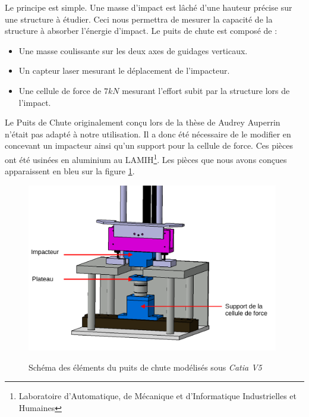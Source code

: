 \documentclass[a4paper]{article}
\begin{document}
	Le principe est simple. Une masse d'impact est lâché d’une hauteur précise sur une structure à étudier. Ceci nous permettra de mesurer la capacité de la structure à absorber l'énergie d'impact. Le puits de chute est composé de :
	
	\begin{itemize}
		\item Une masse coulissante sur les deux axes de guidages verticaux.
		\item Un capteur laser mesurant le déplacement de l'impacteur.
		\item Une cellule de force de $7 kN$ mesurant l'effort subit par la structure lors de l'impact.
	\end{itemize}

	Le Puits de Chute originalement conçu lors de la thèse de Audrey Auperrin \cite{these_auperrin} n'était pas adapté à notre utilisation. Il a donc été nécessaire de le modifier en concevant un impacteur ainsi qu'un support pour la cellule de force. Ces pièces ont été usinées en aluminium au LAMIH\footnote{Laboratoire d'Automatique, de Mécanique et d'Informatique Industrielles et Humaines}. Les pièces que nous avons conçues apparaissent en bleu sur la figure \ref{pieces_pdc}.
	
	\begin{figure}[H]
		\centering
		\includegraphics[width=11cm]{Images/6/conception_finale.pdf}\\
		\caption{Schéma des éléments du puits de chute modélisés sous \textit{Catia V5}}
		\label{pieces_pdc}
	\end{figure}
	\newpage
	
\end{document}
